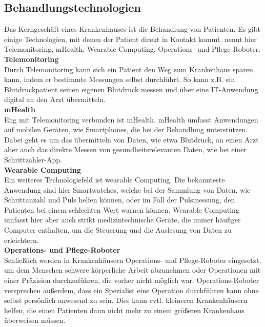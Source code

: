 	\subsection{Behandlungstechnologien}
		Das Kerngeschäft eines Krankenhauses ist die Behandlung von Patienten. Es gibt einige Technologien, mit denen der Patient direkt in Kontakt kommt.
		\cite{braeutigam2017} nennt hier Telemonitoring, mHealth, Wearable Computing, Operations- und Pflege-Roboter.
		\vspace{1ex}\\
		\textbf{Telemonitoring}\\
		Durch Telemonitoring kann sich ein Patient den Weg zum Krankenhaus sparen kann, indem er bestimmte Messungen selbst durchführt. So kann z.B. ein Blutdruckpatient seinen eigenen Blutdruck messen und über eine IT-Anwendung digital an den Arzt übermitteln. 
		\vspace{1ex}\\
		\textbf{mHealth}\\
		Eng mit Telemonitoring verbunden ist mHealth. mHealth umfasst Anwendungen auf mobilen Geräten, wie Smartphones, die bei der Behandlung unterstützen. Dabei geht es um das übermitteln von Daten, wie etwa Blutdruck, an einen Arzt aber auch das direkte Messen von gesundheitsrelevanten Daten, wie bei einer Schrittzähler-App. \parencite{Matusiewicz2017}
		\vspace{1ex}\\
		\textbf{Wearable Computing}\\
		Ein weiteres Technologiefeld ist wearable Computing. Die bekannteste Anwendung sind hier Smartwatches, welche bei der Sammlung von Daten, wie Schrittanzahl und Puls helfen können, oder im Fall der Pulsmessung, den Patienten bei einem schlechten Wert warnen können. Wearable Computing umfasst hier aber auch strikt medizintechnische Geräte, die immer häufiger Computer enthalten, um die Steuerung und die Auslesung von Daten zu erleichtern. \parencite{Gerke2017}
		\vspace{1ex}\\
		\textbf{Operations- und Pflege-Roboter}\\
		Schließlich werden in Krankenhäusern Operations- und Pflege-Roboter eingesetzt, um dem Menschen schwere körperliche Arbeit abzunehmen oder Operationen mit einer Präzision durchzuführen, die vorher nicht möglich war. Operations-Roboter versprechen außerdem, dass ein Spezialist eine Operation durchführen kann ohne selbst persönlich anwesend zu sein. Dies kann evtl. kleineren Krankenhäusern helfen, die einen Patienten dann nicht mehr zu einem größeren Krankenhaus überweisen müssen. \parencite{Bardash2010}
